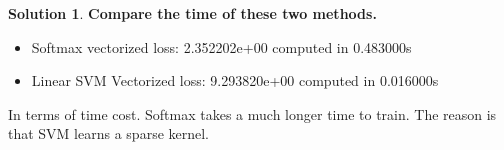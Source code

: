 \documentclass[]{book}
\theoremstyle{definition}
\newtheorem*{soln}{Solution}
\begin{document}
\begin{enumerate}
\begin{soln}
		\textbf{Compare the time of these two methods.}
		\begin{itemize}
			\item Softmax vectorized loss: 2.352202e+00 computed in 0.483000s
			\item Linear SVM Vectorized loss: 9.293820e+00 computed in 0.016000s
		\end{itemize}
		In terms of time cost. Softmax takes a much longer time to train. The reason is that SVM learns a sparse kernel.
		
		
		
	\end{soln}
	
\end{enumerate}
\end{document}
